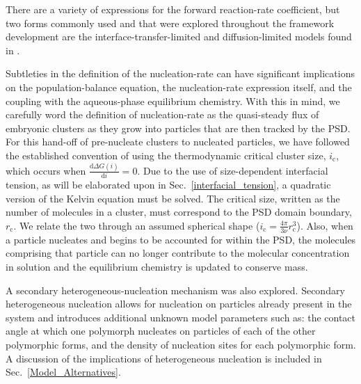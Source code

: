 \documentclass[preprint,3p,a4paper,times,12pt,authoryear]{elsarticle}
\begin{document}
There are a variety of expressions for the forward reaction-rate coefficient, but two forms commonly used and that were explored throughout the framework development are the interface-transfer-limited and diffusion-limited models  found in \cite{Kashchiev2003}. %

Subtleties in the definition of the nucleation-rate can have significant implications on the population-balance equation, the nucleation-rate expression itself, and the coupling with the aqueous-phase equilibrium chemistry. With this in mind, we carefully word the definition of nucleation-rate as the quasi-steady flux of embryonic clusters as they grow into particles that are then tracked by the PSD. For this hand-off of pre-nucleate clusters to nucleated particles, we have followed the established convention of using the thermodynamic critical cluster size, $i_{\text{c}}$, which occurs when $\frac{\mathrm{d} \Delta G(i)}{\mathrm{d}i} = 0$.  Due to the use of size-dependent interfacial tension, as will be elaborated upon in Sec.~\ref{interfacial_tension}, a quadratic version of the Kelvin equation \citep{Dirksen1991} must be solved.
The critical size, written as the number of molecules in a cluster, must correspond to the PSD domain boundary, $r_\text{c}$.  We relate the two through an assumed spherical shape ($i_{\text{c}}=\frac{4 \pi}{3 \nu}r_{\text{c}}^3$).  Also, when a particle nucleates and begins to be accounted for within the PSD, the molecules comprising that particle can no longer contribute to the molecular concentration in solution and the equilibrium chemistry is updated to conserve mass.

A secondary heterogeneous-nucleation mechanism \citep{Kashchiev2003} was also explored. Secondary heterogeneous nucleation allows for nucleation on particles already present in the system and introduces additional unknown model parameters such as: the contact angle at which one polymorph nucleates on particles of each of the other polymorphic forms, and the density of nucleation sites for each polymorphic form.  A discussion of the implications of heterogeneous nucleation is included in Sec.~\ref{Model_Alternatives}.
\end{document}
